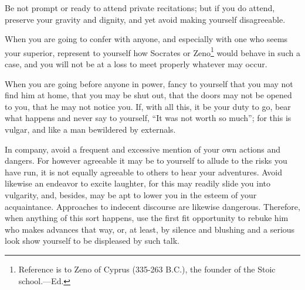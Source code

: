 Be not  prompt or ready  to attend private recitations;  but if you  do attend,
preserve your gravity and dignity, and yet avoid making yourself disagreeable.

When you  are going to  confer with anyone, and  especially with one  who seems
your superior, represent to yourself how Socrates or Zeno\footnote{Reference is
to Zeno of Cyprus (335-263 B.C.), the founder of the Stoic school.---Ed.} would
behave in such a case, and you will  not be at a loss to meet properly whatever
may occur.

When you are going  before anyone in power, fancy to yourself  that you may not
find him at home, that you may be shut out, that the doors may not be opened to
you, that he may not notice you. If, with all this, it be your duty to go, bear
what happens and never say to yourself,  ``It was not worth so much''; for this
is vulgar, and like a man bewildered by externals.

In company,  avoid a  frequent and  excessive mention of  your own  actions and
dangers. For however agreeable it may be to yourself to allude to the risks you
have run, it is not equally agreeable  to others to hear your adventures. Avoid
likewise  an endeavor  to  excite  laughter, for  this  may  readily slide  you
into  vulgarity, and,  besides,  may be  apt  to  lower you  in  the esteem  of
your  acquaintance. Approaches  to indecent  discourse are  likewise dangerous.
Therefore, when anything of this sort happens, use the first fit opportunity to
rebuke him who makes  advances that way, or, at least,  by silence and blushing
and a serious look show yourself to be displeased by such talk.
